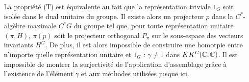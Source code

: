 La propriété (T) est équivalente au fait que la représentation triviale $1_G$ soit isolée dans le dual unitaire du groupe. Il existe alors un projecteur $p$ dans la $C^*$-algèbre maximale $C^*G$ du groupe tel que, pour toute représentation unitaire $(\pi,H)$, $\pi(p)$ soit le projecteur orthogonal $P_\pi$ sur le sous-espace des vecteurs invariants $H^G$. De plus, il est alors impossible de construire une homotpie entre n'importe quelle représentation unitaire et $1_G$ : $\gamma \neq 1$ dans $KK^G(\mathbb C,\mathbb C)$. Il est impossible de montrer la surjectivité de l'application d'assemblage grâce à l'existence de l'élément $\gamma$ et aux méthodes utilisées jusque ici.\\

























